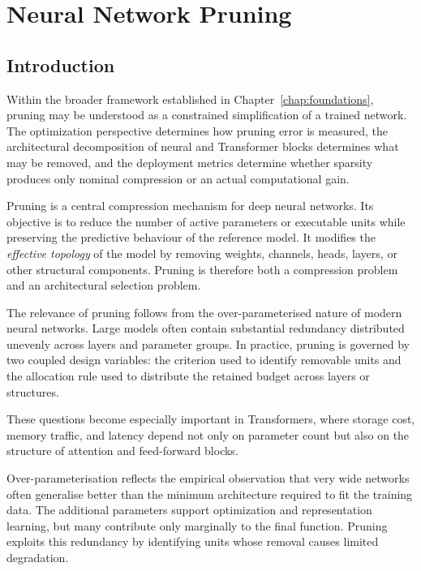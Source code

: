 ﻿%
\chapter{Neural Network Pruning}
\label{chap:neural_network_pruning}

\section{Introduction}

Within the broader framework established in Chapter~\ref{chap:foundations}, pruning may
be understood as a constrained simplification of a trained network. The
optimization perspective determines how pruning error is measured, the
architectural decomposition of neural and Transformer blocks determines what
may be removed, and the deployment metrics determine whether sparsity produces
only nominal compression or an actual computational gain.

Pruning is a central compression mechanism for deep neural networks. Its
objective is to reduce the number of active parameters or executable units
while preserving the predictive behaviour of the reference model. It modifies
the \emph{effective topology} of the model by removing weights, channels,
heads, layers, or other structural components. Pruning is therefore both a
compression problem and an architectural selection problem.

The relevance of pruning follows from the over-parameterised nature of modern
neural networks. Large models often contain substantial redundancy distributed
unevenly across layers and parameter groups. In practice, pruning is governed
by two coupled design variables: the criterion used to identify removable
units and the allocation rule used to distribute the retained budget across
layers or structures.

These questions become especially important in Transformers, where storage cost,
memory traffic, and latency depend not only on parameter count but also on the
structure of attention and feed-forward blocks.

Over-parameterisation reflects the empirical observation that very wide
networks often generalise better than the minimum architecture required to fit
the training data. The additional parameters support optimization and
representation learning, but many contribute only marginally to the final
function. Pruning exploits this redundancy by identifying units whose removal
causes limited degradation.


